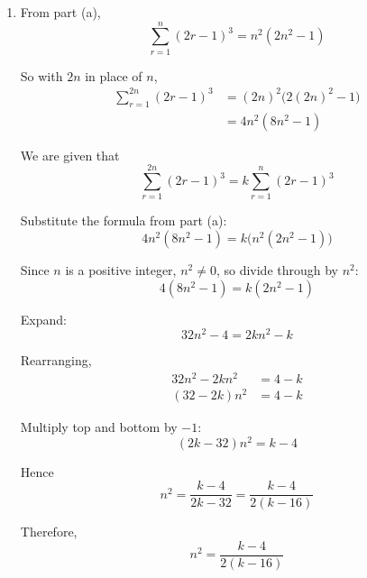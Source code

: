 \documentclass[leqno]{article}
\begin{document}
\begin{enumerate}[
  label=\textbf{\arabic*.},
  leftmargin=*,
  topsep=0pt,
  partopsep=0pt,
  parsep=0pt
]
\begin{tcolorbox}[colback=white, colframe=scarlet, title={\textbf{Solution}}, breakable, grow to left by=6mm, grow to right by=10mm]
\begin{enumerate}[label=\textbf{(\alph*)}]
  Now use the inductive hypothesis:
  \begin{align*}
  S_{k+1}
  &=k^2(2k^2-1)+(2k+1)^3 \\
  &=2k^4-k^2+(8k^3+12k^2+6k+1) \\
  &=2k^4+8k^3+11k^2+6k+1
  \end{align*}

  We now factor this in the required form:
  \begin{align*}
  (k+1)^2\bigl(2(k+1)^2-1\bigr)
  &=(k+1)^2(2k^2+4k+1) \\
  &=(k^2+2k+1)(2k^2+4k+1) \\
  &=2k^4+8k^3+11k^2+6k+1
  \end{align*}

  Hence
  \[
  S_{k+1}=(k+1)^2\bigl(2(k+1)^2-1\bigr)
  \]

  So, if the formula is true for $n=k$, it is also true for $n=k+1$.

  Therefore, by mathematical induction,
  \[
  \sum_{r=1}^{n}(2r-1)^3=n^2(2n^2-1)
  \]
  for all positive integers $n$.

  \item From part (a),
  \[
  \sum_{r=1}^{n}(2r-1)^3=n^2(2n^2-1)
  \]

  So with $2n$ in place of $n$,
  \begin{align*}
  \sum_{r=1}^{2n}(2r-1)^3
  &=(2n)^2\bigl(2(2n)^2-1\bigr) \\
  &=4n^2(8n^2-1)
  \end{align*}

  We are given that
  \[
  \sum_{r=1}^{2n}(2r-1)^3=k\sum_{r=1}^{n}(2r-1)^3
  \]

  Substitute the formula from part (a):
  \[
  4n^2(8n^2-1)=k\bigl(n^2(2n^2-1)\bigr)
  \]

  Since $n$ is a positive integer, $n^2\neq 0$, so divide through by $n^2$:
  \[
  4(8n^2-1)=k(2n^2-1)
  \]

  Expand:
  \[
  32n^2-4=2kn^2-k
  \]

  Rearranging,
  \begin{align*}
  32n^2-2kn^2&=4-k \\
  (32-2k)n^2&=4-k
  \end{align*}

  Multiply top and bottom by $-1$:
  \[
  (2k-32)n^2=k-4
  \]

  Hence
  \[
  n^2=\frac{k-4}{2k-32}=\frac{k-4}{2(k-16)}
  \]

  Therefore,
  \[
  n^2=\frac{k-4}{2(k-16)}
  \]
\end{enumerate}
\end{tcolorbox}



\end{enumerate}
\end{document}
